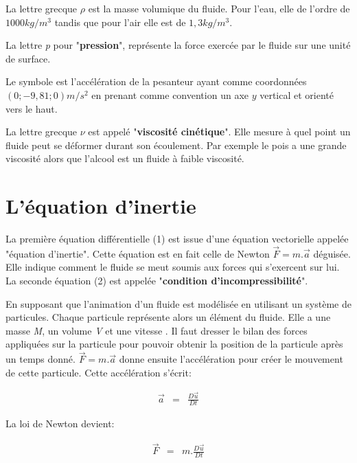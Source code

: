 \documentclass[11pt]{report}
\begin{document}
La lettre grecque $  \rho $ est la masse volumique du fluide. Pour l'eau, elle de l'ordre de $ 1000kg/m^3 $ tandis que pour l'air elle est de $ 1,3kg/m^3 $. \newline

La lettre \textit{p} pour "\textbf{pression}", représente la force exercée par le fluide sur une unité de surface. \newline

Le symbole  est l'accélération de la pesanteur ayant comme coordonnées $(0; -9,81; 0) m/s^2 $ en prenant comme convention un axe $ y $ vertical et orienté vers le haut. \newline

La lettre grecque $\nu$ est appelé "\textbf{viscosité cinétique}". Elle mesure à quel point un fluide peut se déformer durant son écoulement. Par exemple le pois a une grande viscosité alors que l'alcool est un fluide à faible viscosité.

\section{L'équation d'inertie}

La première équation différentielle (1) est issue d'une équation vectorielle appelée "équation d'inertie". Cette équation est en fait celle de Newton $ \overrightarrow{F} = m. \overrightarrow{a} $ déguisée. Elle indique comment le fluide se meut soumis aux forces qui s'exercent sur lui. La seconde équation (2) est appelée "\textbf{condition d'incompressibilité}".

En supposant que l'animation d'un fluide est modélisée en utilisant un système de particules. Chaque particule représente alors un élément du fluide. Elle a une masse \textit{M}, un volume \textit{V} et une vitesse . Il faut dresser le bilan des forces appliquées sur la particule pour pouvoir obtenir la position de la particule après un temps donné. $ \overrightarrow{F} = m. \overrightarrow{a} $ donne ensuite l'accélération pour créer le mouvement de cette particule. Cette accélération s'écrit:

\begin{eqnarray}
\overrightarrow{a} & = & \frac{D \overrightarrow{u}}{Dt}
\end{eqnarray}

La loi de Newton devient:

\begin{eqnarray}
\overrightarrow{F} & = & m. \frac{D \overrightarrow{u}}{Dt}
\end{eqnarray}
\end{document}
